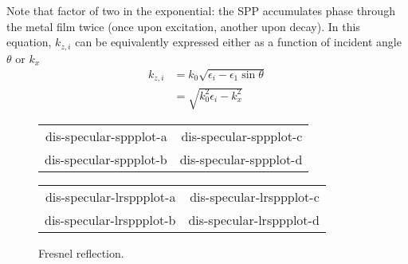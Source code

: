 Note that factor of two in the exponential: the SPP accumulates phase
through the metal film twice (once upon excitation, another upon decay).
In this equation, $k_{z,i}$ can be equivalently expressed either as a
function of incident angle $\theta$ or $k_x$
\begin{align}
k_{z,i} &= k_0 \sqrt{\epsilon_i - \epsilon_1 \sin \theta}\\
&= \sqrt{k_0^2\epsilon_i - k_x^2}
\end{align}
%
%

\begin{figure}[ht]
 \centering
 \pgfplotsset{
 minor tick num=3,
 footnotesize,
 trim axis right,
 max space between ticks=30pt,
}
\tikzset{baseline}
\begin{tabular}{rr}
{dis-specular-sppplot-a}&{dis-specular-sppplot-c}\\
{dis-specular-sppplot-b}&{dis-specular-sppplot-d}
\end{tabular}
\begin{tabular}{rr}
{dis-specular-lrsppplot-a}&{dis-specular-lrsppplot-c}\\
{dis-specular-lrsppplot-b}&{dis-specular-lrsppplot-d}
\end{tabular}

\label{fig:fresnellrsppfig}
\caption{Fresnel reflection.}
\end{figure}

